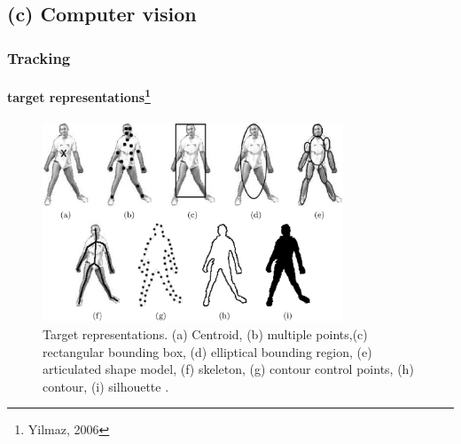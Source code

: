 \begin{frame}
\begin{figure}
\end{figure}
\end{frame}



\subsection{(c) Computer vision}
\begin{frame}
\frametitle{Tracking}
\framesubtitle{target representations\footnote{Yilmaz, 2006}}
\logoCSIPCPL\mypagenum
\begin{figure}[t]
\center
\includegraphics[width=0.8\textwidth]{thesis/2006_JNL_TRKsurvey_Shah_fig1.png}
\caption{Target representations.  (a) Centroid, (b) multiple points,(c) rectangular bounding box, (d) elliptical bounding region, (e) articulated shape model, (f) skeleton, (g) contour control points, (h) contour, (i) silhouette \cite{2006_JNL_SURVEYtrk_Yilmaz}.}
\label{fig:TRK_objectRepresentations}
\end{figure}
\end{frame}



